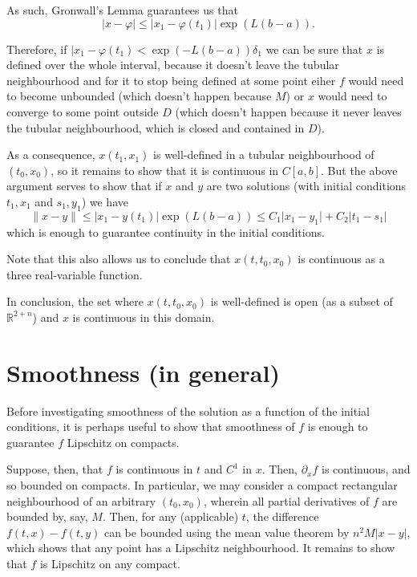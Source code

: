 \documentclass{article}
\newcommand{\R}{\mathbb{R}}
\begin{document}
As such, Gronwall's Lemma guarantees us that
\[\lvert x - \varphi \rvert \leq \lvert x_1 - \varphi(t_1) \rvert \exp(L(b-a)).\]

Therefore, if $\lvert x_1 - \varphi(t_1) < \exp(-L(b-a)) \delta_1$ we can be sure that $x$ is defined over the whole interval, because it doesn't leave the tubular neighbourhood and for it to stop being defined at some point eiher $f$ would need to become unbounded (which doesn't happen because $M$) or $x$ would need to converge to some point outside $D$ (which doesn't happen because it never leaves the tubular neighbourhood, which is closed and contained in $D$).

As a consequence, $x(t_1, x_1)$ is well-defined in a tubular neighbourhood of $(t_0, x_0)$, so it remains to show that it is continuous in $C[a,b]$. But the above argument serves to show that if $x$ and $y$ are two solutions (with initial conditions $t_1, x_1$ and $s_1, y_1$) we have
\begin{equation}\label{uniformcontinuity}
\lVert x - y \rVert \leq \lvert x_1 - y(t_1) \rvert \exp(L(b-a)) \leq C_1 \lvert x_1 - y_1 \rvert + C_2 \lvert t_1 - s_1 \rvert
\end{equation}
which is enough to guarantee continuity in the initial conditions.

Note that this also allows us to conclude that $x(t,t_0,x_0)$ is continuous as a three real-variable function.

In conclusion, the set where $x(t,t_0,x_0)$ is well-defined is open (as a subset of $\R^{2+n}$) and $x$ is continuous in this domain.

\section{Smoothness (in general)}

Before investigating smoothness of the solution as a function of the initial conditions, it is perhaps useful to show that smoothness of $f$ is enough to guarantee $f$ Lipschitz on compacts.

Suppose, then, that $f$ is continuous in $t$ and $C^1$ in $x$. Then, $\partial_x f$ is continuous, and so bounded on compacts. In particular, we may consider a compact rectangular neighbourhood of an arbitrary $(t_0, x_0)$, wherein all partial derivatives of $f$ are bounded by, say, $M$. Then, for any (applicable) $t$, the difference $f(t,x) - f(t,y)$ can be bounded using the mean value theorem by $n^2 M \lvert x - y \rvert$, which shows that any point has a Lipschitz neighbourhood. It remains to show that $f$ is Lipschitz on any compact.
\end{document}
